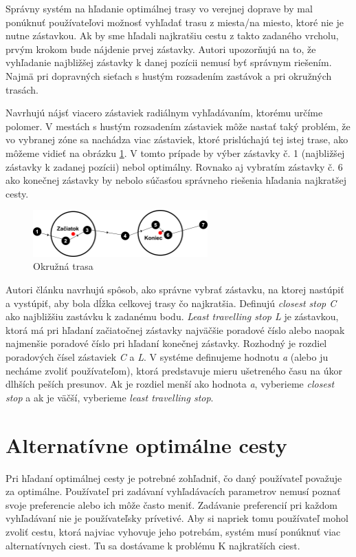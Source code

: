Správny systém na hľadanie optimálnej trasy vo verejnej doprave by mal ponúknuť používateľovi možnosť vyhľadať trasu z miesta/na miesto, ktoré nie je nutne zástavkou. Ak by sme hľadali najkratšiu cestu z takto zadaného vrcholu, prvým krokom bude nájdenie prvej zástavky. Autori upozorňujú na to, že vyhľadanie najbližšej zástavky k danej pozícii nemusí byť správnym riešením. Najmä pri dopravných sieťach s hustým rozsadením zastávok a pri okružných trasách.

Navrhujú nájsť viacero zástaviek radiálnym vyhľadávaním, ktorému určíme polomer. V mestách s hustým rozsadením zástaviek môže nastať taký problém, že vo vybranej zóne sa nachádza viac zástaviek, ktoré prislúchajú tej istej trase, ako môžeme vidieť na obrázku \ref{fig:circularRoute}. V tomto prípade by výber zástavky č. 1 (najbližšej zástavky k zadanej pozícii)  nebol optimálny. Rovnako aj vybratím zástavky č. 6 ako konečnej zástavky by nebolo súčasťou správneho riešenia hľadania najkratšej cesty. 

\begin{figure}[H]
\centerline{\includegraphics[width=0.6\textwidth]{images/circular-route}}
\caption[Okružná trasa]{Okružná trasa}
\label{fig:circularRoute}
\end{figure}

Autori článku navrhujú spôsob, ako správne vybrať zástavku, na ktorej nastúpiť a vystúpiť, aby bola dĺžka celkovej trasy čo najkratšia. Definujú \textit{closest stop C} ako najbližšiu zastávku k zadanému bodu. \textit{Least travelling stop L} je zástavkou, ktorá má pri hľadaní začiatočnej zástavky najväčšie poradové číslo alebo naopak najmenšie poradové číslo pri hľadaní konečnej zástavky. Rozhodný je rozdiel poradových čísel zástaviek \textit{C} a \textit{L}. V systéme definujeme hodnotu \textit{a} (alebo ju necháme zvoliť používateľom), ktorá predstavuje mieru ušetreného času na úkor dlhších peších presunov. Ak je rozdiel menší ako hodnota \textit{a}, vyberieme \textit{closest stop} a ak je väčší, vyberieme \textit{least travelling stop}. 

\section{Alternatívne optimálne cesty}
Pri hľadaní optimálnej cesty je potrebné zohľadniť, čo daný používateľ považuje za optimálne. Používateľ pri zadávaní vyhľadávacích parametrov nemusí poznať svoje preferencie alebo ich môže často meniť. Zadávanie preferencií pri každom vyhľadávaní nie je používateľsky prívetivé. Aby si napriek tomu používateľ mohol zvoliť cestu, ktorá najviac vyhovuje jeho potrebám, systém musí ponúknuť viac alternatívnych ciest. Tu sa dostávame k problému K najkratších ciest.

